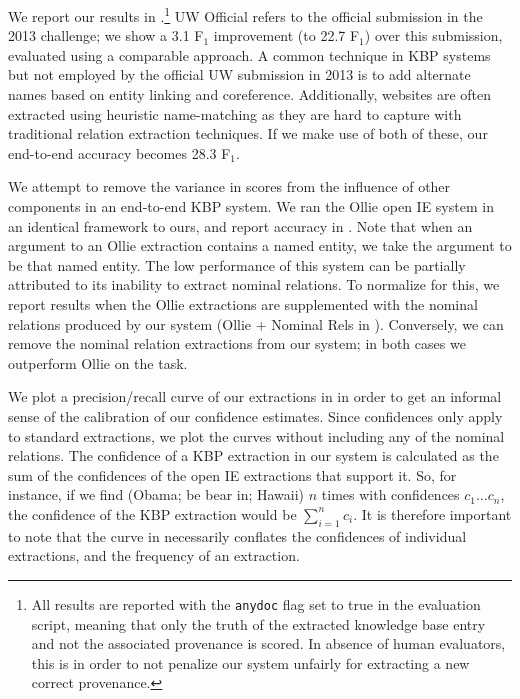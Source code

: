 We report our results in .\footnote{
  All results are reported with the \texttt{anydoc} flag set to true
    in the evaluation script, meaning that only the truth of the extracted
    knowledge base entry and not the associated provenance is scored.
  In absence of human evaluators, this is in order to not penalize our 
    system unfairly for extracting a new correct provenance.
  }
UW Official refers to the official submission in the 2013 challenge;
  we show a 3.1 F$_1$ improvement (to 22.7 F$_1$) over this submission, 
  evaluated using a comparable approach.
A common technique in KBP systems but not employed by the official UW
  submission in 2013 is to add alternate names 
  based on entity linking and coreference.
Additionally, websites are often extracted using heuristic name-matching
  as they are hard to capture with traditional relation extraction 
  techniques.
If we make use of both of these, our end-to-end accuracy becomes 28.3 F$_1$.

We attempt to remove the variance in scores from the influence of 
  other components in an end-to-end KBP system.
We ran the Ollie open IE system \cite{key:2012mausam-ollie} in an identical
  framework to ours, and report accuracy in .
Note that when an argument to an Ollie extraction contains a named entity, 
  we take the argument to be that named entity.
The low performance of this system can be partially attributed to its inability
  to extract nominal relations.
To normalize for this, we report results when the Ollie extractions are
  supplemented with the nominal relations produced by our system
  (Ollie + Nominal Rels in ).
Conversely, we can remove the nominal relation extractions from
  our system; in both cases we outperform Ollie on the task.


We plot a precision/recall curve of our extractions in  in order 
  to get an informal sense of the calibration of our confidence estimates.
Since confidences only apply to standard extractions, we plot the curves
  without including any of the nominal relations.
The confidence of a KBP extraction in our system is calculated as the sum
  of the confidences of the open IE extractions that support it.
So, for instance, if we find (Obama; be bear in; Hawaii) $n$ times with
  confidences $c_1 \dots c_n$, the confidence of the KBP extraction would be
  $\sum_{i=1}^n c_i$.
It is therefore important to note that the curve in  necessarily
  conflates the confidences of individual extractions, and the frequency
  of an extraction.


